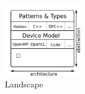 

\begin{figure}
\centerline{\includegraphics[width=0.3\textwidth]{img/Stack.png}}
\caption{Landscape}
\label{fig:stack}
\end{figure}


